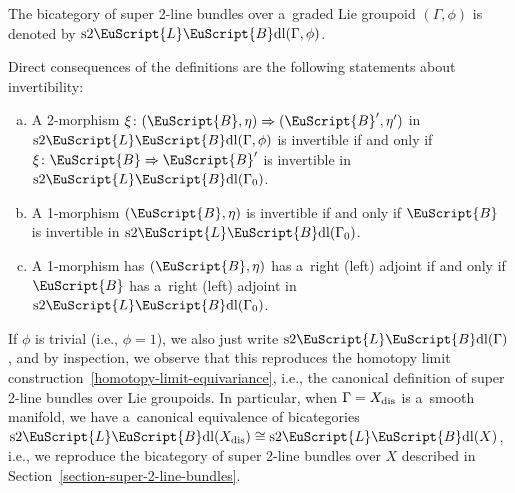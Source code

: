 \documentclass[pdftex]{sigma}
\numberwithin{equation}{section}
\def\mathscr#1{\EuScript{#1}}
\newcommand{\LineBdl}{\mathscr{L}\mathscr{B}\mathrm{dl}}
\newcommand{\stwoLineBdl}{\mathrm{s}2\LineBdl}
\begin{document}
\begin{Definition} \label{The bicategory of super 2-line bundles definition}
The bicategory of super 2-line bundles over a~graded Lie groupoid $(\Gamma,\phi)$ is denoted by $\stwoLineBdl(\Gamma,\phi)$.
\end{Definition}


\begin{Remark} \label{Inverse and adjoint of graded-equivariant 1-morphisms}
 Direct consequences of the definitions are the following statements about invertibility:
\begin{enumerate}[(a)]\itemsep=0pt
\item
 A 2-morphism $\xi\colon (\mathscr{B},\eta)\Rightarrow (\mathscr{B}',\eta')$ in $\stwoLineBdl(\Gamma,\phi)$ is invertible if and only if $\xi\colon \mathscr{B} \Rightarrow \mathscr{B}'$
is invertible in $\stwoLineBdl(\Gamma_0)$.

\item
A 1-morphism $(\mathscr{B},\eta)$ is invertible if and only if $\mathscr{B}$ is invertible in $\stwoLineBdl(\Gamma_0)$.

\item
A 1-morphism has $(\mathscr{B},\eta)$ has a~right (left)
 adjoint if and only if $\mathscr{B}$ has a~right (left) adjoint in $\stwoLineBdl(\Gamma_0)$.
\end{enumerate}
\end{Remark}

\begin{Remark}
\label{graded-equivariant-over-a-manifold}
If $\phi$ is trivial (i.e., $\phi=1$), we also just write
$\stwoLineBdl(\Gamma)$, and by inspection, we observe that this reproduces the homotopy limit construction~\eqref{homotopy-limit-equivariance}, i.e., the canonical definition of super 2-line bundles over Lie groupoids. In particular, when $\Gamma=X_{\rm dis}$ is a~smooth manifold, we have a~canonical equivalence of bicategories
$
\stwoLineBdl(X_{\rm dis})\cong \stwoLineBdl(X)$,
i.e., we reproduce the bicategory of super 2-line bundles over $X$ described in Section~\ref{section-super-2-line-bundles}.
\end{Remark}
\end{document}
